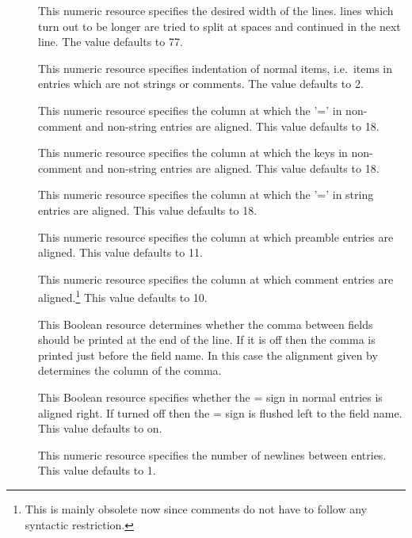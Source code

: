 \documentclass[11pt,a4paper]{scrbook}
\begin{document}
\begin{description}
  \item []
        This numeric resource specifies the desired width of the lines. lines
        which turn out to be longer are tried to split at spaces and continued
        in the next line. The value defaults to 77.
  \item []
        This numeric resource specifies indentation of normal items, i.e.\
        items in entries which are not strings or comments. The value defaults
        to 2.
  \item []
        This numeric resource specifies the column at which the '=' in
        non-comment and non-string entries are aligned. This value defaults
        to 18.
  \item []
        This numeric resource specifies the column at which the keys in
        non-comment and non-string entries are aligned. This value defaults
        to 18.
  \item []
        This numeric resource specifies the column at which the '=' in string
        entries are aligned. This value defaults to 18.
  \item []
        This numeric resource specifies the column at which preamble
        entries are aligned. This value defaults to 11.
  \item []
        This numeric resource specifies the column at which comment
        entries are aligned.\footnote{This is mainly obsolete now
        since comments do not have to follow any syntactic
        restriction.} This value defaults to 10. 
  \item []
    	This Boolean resource determines whether the comma between fields
    	should be printed at the end of the line. If it is \textsf{off} then
    	the comma is printed just before the field name. In this case the
    	alignment given by \rsc{print.align} determines the column of the
    	comma.
  \item []
        This Boolean resource specifies whether the = sign in normal entries
        is aligned right. If turned off then the = sign is flushed left to the
        field name. This value defaults to \textsf{on}.
  \item []
        This numeric resource specifies the number of newlines between
        entries. This value defaults to 1.

\end{description}
\end{document}
